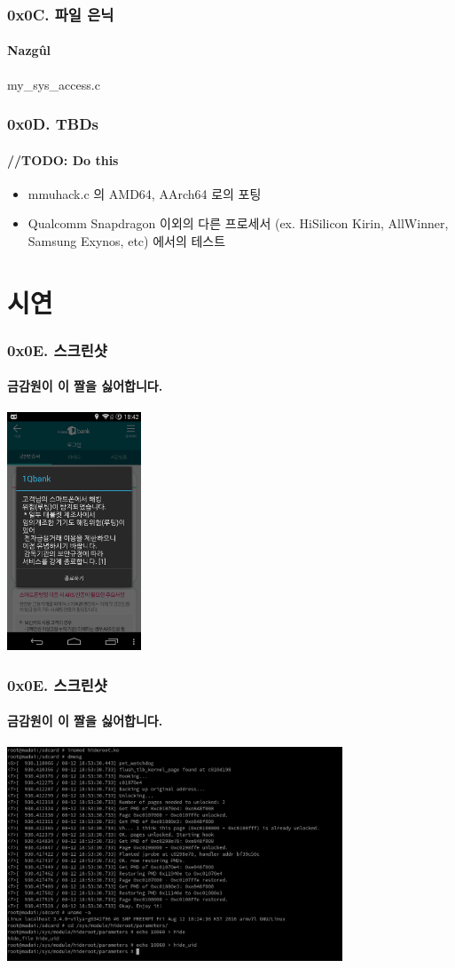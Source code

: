 \begin{frame}
  \frametitle{0x0C. 파일 은닉}
  \framesubtitle{Nazgûl}

  {my_sys_access.c}
\end{frame}

\begin{frame}
  \frametitle{0x0D. TBDs}
  \framesubtitle{//TODO: Do this}

  \begin{itemize}
  \item mmuhack.c 의 AMD64, AArch64 로의 포팅
  \item Qualcomm Snapdragon 이외의 다른 프로세서 (ex. HiSilicon Kirin, AllWinner, Samsung Exynos, etc) 에서의 테스트
  \end{itemize}
\end{frame}

\section[Section]{시연}
\begin{frame}
  \frametitle{0x0E. 스크린샷}
  \framesubtitle{금감원이 이 짤을 싫어합니다.}

  \begin{center}
    \includegraphics [width=40mm]{img/Hana1Qroot.png}
  \end{center}
\end{frame}

\begin{frame}
  \frametitle{0x0E. 스크린샷}
  \framesubtitle{금감원이 이 짤을 싫어합니다.}

  \begin{center}
    \includegraphics [width=100mm]{img/hideroot_init.png}
  \end{center}
\end{frame}

